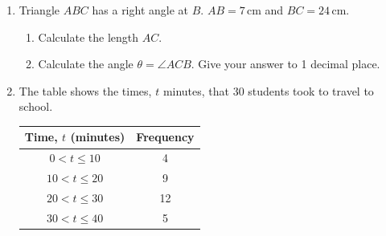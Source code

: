 \documentclass[12pt,a4paper]{article}
\begin{document}
\begin{enumerate}
\begin{enumerate}
        \vspace{1.5cm}
        \item Each interior angle of a regular polygon is $156^\circ$. How many sides does the polygon have?
        \vspace{2cm}
    \end{enumerate}

    \item Triangle $ABC$ has a right angle at $B$. $AB = 7$\,cm and $BC = 24$\,cm.

    \begin{center}
    \end{center}

    \begin{enumerate}
        \item Calculate the length $AC$.
        \vspace{2cm}
        \item Calculate the angle $\theta = \angle ACB$. Give your answer to 1 decimal place.
        \vspace{2cm}
    \end{enumerate}

    \item The table shows the times, $t$ minutes, that 30 students took to travel to school.

    \begin{center}
    \renewcommand{\arraystretch}{1.3}
    \begin{tabular}{|c|c|}
        \hline
        Time, $t$ (minutes) & Frequency \\
        \hline
        $0 < t \le 10$ & 4 \\
        $10 < t \le 20$ & 9 \\
        $20 < t \le 30$ & 12 \\
        $30 < t \le 40$ & 5 \\
        \hline
    \end{tabular}
    \end{center}


\end{enumerate}
\end{document}

